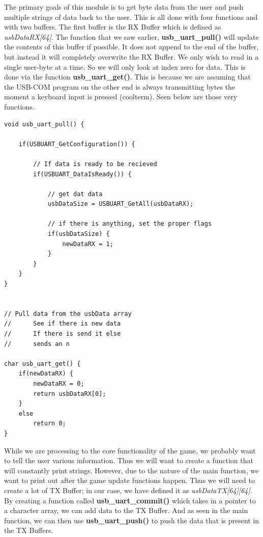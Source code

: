 \documentclass[a4paper, 12pt]{article}
\begin{document}
    The primary goals of this module is to get byte data from the user and
    push multiple strings of data back to the user. This is all done with
    four functions and with two buffers. The first buffer is the RX Buffer
    which is defined as \textit{usbDataRX[64]}. The function that we saw
    earlier, \textbf{usb\_uart\_pull()} will update the contents of this
    buffer if possible. It does not append to the end of the buffer, but
    instead it will completely overwrite the RX Buffer. We only wish to
    read in a single user-byte at a time. So we will only look at index zero
    for data. This is done via the function \textbf{usb\_uart\_get()}.
    This is because we are assuming that the USB-COM program on
    the other end is always transmitting bytes the moment a keyboard input is
    pressed (coolterm). Seen below are those very functions.

    \begin{verbatim}
void usb_uart_pull() {
        
    if(USBUART_GetConfiguration()) {
        
        // If data is ready to be recieved
        if(USBUART_DataIsReady()) {
            
            // get dat data
            usbDataSize = USBUART_GetAll(usbDataRX); 
            
            // if there is anything, set the proper flags
            if(usbDataSize) {                
                newDataRX = 1;
            }
        }
    }
}


// Pull data from the usbData array
//      See if there is new data
//      If there is send it else
//      sends an n

char usb_uart_get() {
    if(newDataRX) {
        newDataRX = 0;
        return usbDataRX[0];
    }
    else
        return 0;
}
    \end{verbatim}

    While we are processing to the core functionality of the game, we probably
    want to tell the user various information. Thus we will want to create a
    function that will constantly print strings. However, due to the nature of
    the main function, we want to print out after the game update functions
    happen. Thus we will need to create a lot of TX Buffer; in our case, we have
    defined it as \textit{usbDataTX[64][64]}. By creating a function called
    \textbf{usb\_uart\_commit()} which takes in a pointer to a character
    array, we can add data to the TX Buffer. And as seen in the main function,
    we can then use \textbf{usb\_uart\_push()} to push the data that is
    present in the TX Buffers.
\end{document}
